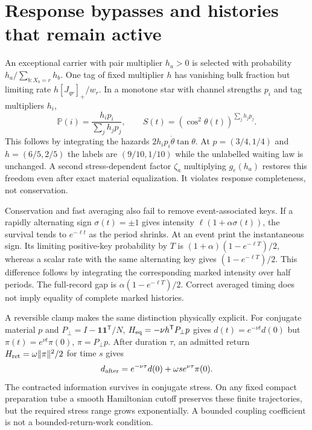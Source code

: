 \documentclass[11pt,oneside,openany]{book}
\theoremstyle{definition}
\theoremstyle{remark}\newtheorem{remark}[theorem]{Remark}
\begin{document}
\section{Response bypasses and histories that remain active}
An exceptional carrier with pair multiplier $h_a>0$ is selected with
probability $h_a/\sum_{b:X_b=r}h_b$. One tag of fixed multiplier $h$ has
vanishing bulk fraction but limiting rate $h[J_{qr}]_+/w_r$.
In a monotone star with channel strengths $p_i$ and tag multipliers $h_i$,
\begin{equation}
 \mathbb P(i)=\frac{h_ip_i}{\sum_jh_jp_j},\qquad
 S(t)=(\cos^2\theta(t))^{\sum_jh_jp_j}.
 \label{kin:exceptional}
\end{equation}
This follows by integrating the hazards
$2h_ip_i\dot\theta\tan\theta$.
At $p=(3/4,1/4)$ and $h=(6/5,2/5)$ the labels are $(9/10,1/10)$ while
the unlabelled waiting law is unchanged. A second stress-dependent factor
$\zeta_a$ multiplying $g_e(h_a)$ restores this freedom even after exact
material equalization. It violates response completeness, not conservation.

Conservation and fast averaging also fail to remove event-associated
keys. If a rapidly alternating sign $\sigma(t)=\pm1$ gives intensity
$\ell(1+\alpha\sigma(t))$, the survival tends to $e^{-\ell t}$ as the
period shrinks. At an event print the instantaneous sign. Its limiting
positive-key probability by $T$ is
$(1+\alpha)(1-e^{-\ell T})/2$, whereas a scalar rate with the same
alternating key gives $(1-e^{-\ell T})/2$. This difference follows by
integrating the corresponding marked intensity over half periods.
The full-record gap is $\alpha(1-e^{-\ell T})/2$. Correct averaged timing
does not imply equality of complete marked histories.

A reversible clamp makes the same distinction physically explicit.
For conjugate material $p$ and $P_\perp=I-\mathbf1\mathbf1^{\mathsf T}/N$,
$H_{\rm eq}=-\nu h^{\mathsf T}P_\perp p$ gives
$d(t)=e^{-\nu t}d(0)$ but
$\pi(t)=e^{\nu t}\pi(0)$, $\pi=P_\perp p$.
After duration $\tau$, an admitted return
$H_{\rm ret}=\omega\|\pi\|^2/2$ for time $s$ gives
\[
 d_{\rm after}=e^{-\nu\tau}d(0)+\omega s e^{\nu\tau}\pi(0).
\]
The contracted information survives in conjugate stress. On any fixed
compact preparation tube a smooth Hamiltonian cutoff preserves these
finite trajectories, but the required stress range grows exponentially.
A bounded coupling coefficient is not a bounded-return-work condition.
\end{document}
